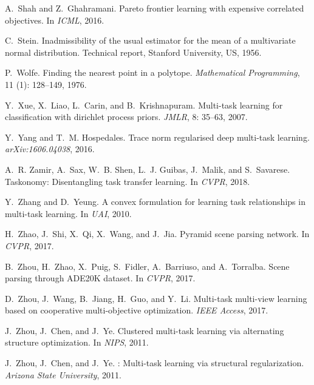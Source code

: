 \documentclass{article}
\begin{document}
{\begin{thebibliography}{60}
A.~Shah and Z.~Ghahramani.
\newblock Pareto frontier learning with expensive correlated objectives.
\newblock In \emph{{ICML}}, 2016.

C.~Stein.
\newblock Inadmissibility of the usual estimator for the mean of a multivariate
  normal distribution.
\newblock Technical report, Stanford University, US, 1956.

P.~Wolfe.
\newblock Finding the nearest point in a polytope.
\newblock \emph{Mathematical Programming}, 11 (1): 128--149,
  1976.

Y.~Xue, X.~Liao, L.~Carin, and B.~Krishnapuram.
\newblock Multi-task learning for classification with dirichlet process priors.
\newblock \emph{JMLR}, 8: 35--63, 2007.

Y.~Yang and T.~M. Hospedales.
\newblock Trace norm regularised deep multi-task learning.
\newblock \emph{arXiv:1606.04038}, 2016.

A.~R. Zamir, A.~Sax, W.~B. Shen, L.~J. Guibas, J.~Malik, and S.~Savarese.
\newblock Taskonomy: Disentangling task transfer learning.
\newblock In \emph{CVPR}, 2018.

Y.~Zhang and D.~Yeung.
\newblock A convex formulation for learning task relationships in multi-task
  learning.
\newblock In \emph{{UAI}}, 2010.

H.~Zhao, J.~Shi, X.~Qi, X.~Wang, and J.~Jia.
\newblock Pyramid scene parsing network.
\newblock In \emph{{CVPR}}, 2017.

B.~Zhou, H.~Zhao, X.~Puig, S.~Fidler, A.~Barriuso, and A.~Torralba.
\newblock Scene parsing through {ADE20K} dataset.
\newblock In \emph{{CVPR}}, 2017{}.

D.~Zhou, J.~Wang, B.~Jiang, H.~Guo, and Y.~Li.
\newblock Multi-task multi-view learning based on cooperative multi-objective
  optimization.
\newblock \emph{IEEE Access}, 2017{}.

J.~Zhou, J.~Chen, and J.~Ye.
\newblock Clustered multi-task learning via alternating structure optimization.
\newblock In \emph{{NIPS}}, 2011{}.

J.~Zhou, J.~Chen, and J.~Ye.
: Multi-task learning via structural regularization.
\newblock \emph{Arizona State University}, 2011{}.

\end{thebibliography}


}
\end{document}
